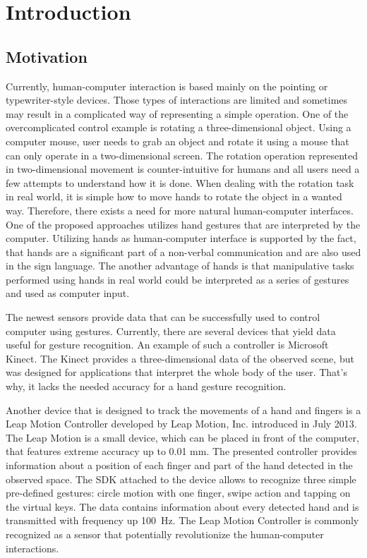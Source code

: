 
\chapter{Introduction} %

\section{Motivation}

Currently, human-computer interaction is based mainly on the pointing or typewriter-style devices. 
Those types of interactions are limited and sometimes may result in a complicated way of representing a simple operation.
One of the overcomplicated control example is rotating a three-dimensional object.
Using a computer mouse, user needs to grab an object and rotate it using a mouse that can only operate in a two-dimensional screen. 
The rotation operation represented in two-dimensional movement is counter-intuitive for humans and all users need a few attempts to understand how it is done. 
When dealing with the rotation task in real world, it is simple how to move hands to rotate the object in a wanted way.
Therefore, there exists a need for more natural human-computer interfaces.
One of the proposed approaches utilizes hand gestures that are interpreted by the computer.
Utilizing hands as human-computer interface is supported by the fact, that hands are a significant part of a non-verbal communication and are also used in the sign language.
The another advantage of hands is that manipulative tasks performed using hands in real world could be interpreted as a series of gestures and used as computer input.

The newest sensors provide data that can be successfully used to control computer using gestures.
Currently, there are several devices that yield data useful for gesture recognition. 
An example of such a controller is Microsoft Kinect.
The Kinect provides a three-dimensional data of the observed scene, but was designed for applications that interpret the whole body of the user. 
That's why, it lacks the needed accuracy for a hand gesture recognition.
 
Another device that is designed to track the movements of a hand and fingers is a Leap Motion Controller developed by Leap Motion, Inc. introduced in July 2013. 
The Leap Motion is a small device, which can be placed in front of the computer, that features extreme accuracy up to 0.01 mm. 
The presented controller provides information about a position of each finger and part of the hand detected in the observed space.
The SDK attached to the device allows to recognize three simple pre-defined gestures: circle motion with one finger, swipe action and tapping on the virtual keys. 
The data contains information about every detected hand and is transmitted with frequency up 100~Hz. 
The Leap Motion Controller is commonly recognized as a sensor that potentially revolutionize the human-computer interactions. 

